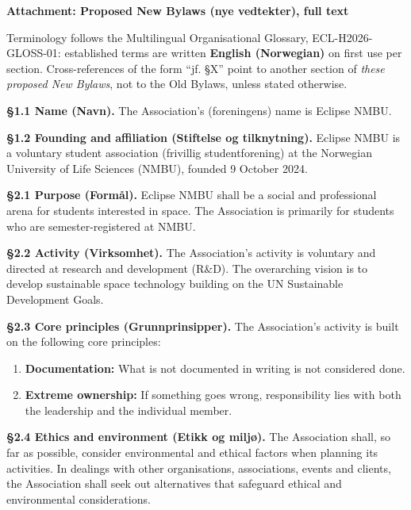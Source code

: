 \documentclass{../../../Common/Latex/Templates/rapport}
\begin{document}
\newpage
\begin{center}
  {\Large\bfseries Attachment: Proposed New Bylaws (nye vedtekter), full text}\par
\end{center}
\tableofcontents

Terminology follows the Multilingual Organisational Glossary, ECL-H2026-GLOSS-01: established terms are written \textbf{English (Norwegian)} on first use per section. Cross-references of the form ``jf. \S X'' point to another section of \emph{these proposed New Bylaws}, not to the Old Bylaws, unless stated otherwise.


\textbf{\S 1.1 Name (Navn).} The Association's (foreningens) name is Eclipse NMBU.

\textbf{\S 1.2 Founding and affiliation (Stiftelse og tilknytning).} Eclipse NMBU is a voluntary student association (frivillig studentforening) at the Norwegian University of Life Sciences (NMBU), founded 9 October 2024.

\textbf{\S 2.1 Purpose (Formål).} Eclipse NMBU shall be a social and professional arena for students interested in space. The Association is primarily for students who are semester-registered at NMBU.

\textbf{\S 2.2 Activity (Virksomhet).} The Association's activity is voluntary and directed at research and development (R\&D). The overarching vision is to develop sustainable space technology building on the UN Sustainable Development Goals.

\textbf{\S 2.3 Core principles (Grunnprinsipper).} The Association's activity is built on the following core principles:
\begin{enumerate}
  \item \textbf{Documentation:} What is not documented in writing is not considered done.
  \item \textbf{Extreme ownership:} If something goes wrong, responsibility lies with both the leadership and the individual member.
\end{enumerate}

\textbf{\S 2.4 Ethics and environment (Etikk og miljø).} The Association shall, so far as possible, consider environmental and ethical factors when planning its activities. In dealings with other organisations, associations, events and clients, the Association shall seek out alternatives that safeguard ethical and environmental considerations.
\end{document}
